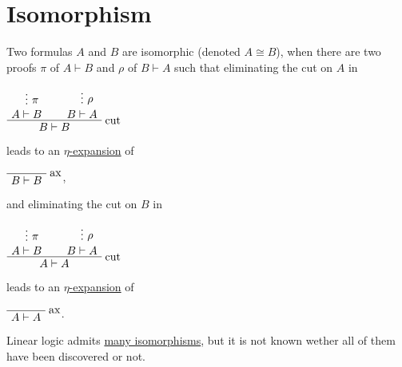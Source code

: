 \section{Isomorphism}\label{isomorphism}

Two formulas \(A\) and \(B\) are isomorphic (denoted \(A\cong B\)), when
there are two proofs \(\pi\) of \(A \vdash B\) and \(\rho\) of
\(B \vdash A\) such that eliminating the cut on \(A\) in

\(\AxRule{}\VdotsRule{\pi}{A \vdash B}\AxRule{}\VdotsRule{\rho}{B \vdash A}\LabelRule{\rulename{cut}}\BinRule{B\vdash B}\DisplayProof\)

leads to an
\href{Sequent_calculus\#Expansion_of_identities}{\(\eta\)-expansion} of

\(\LabelRule{\rulename{ax}}\NulRule{B\vdash B}\DisplayProof\),

and eliminating the cut on \(B\) in

\(\AxRule{}\VdotsRule{\pi}{A \vdash B}\AxRule{}\VdotsRule{\rho}{B \vdash A}\LabelRule{\rulename{cut}}\BinRule{A\vdash A}\DisplayProof\)

leads to an
\href{Sequent_calculus\#Expansion_of_identities}{\(\eta\)-expansion} of

\(\LabelRule{\rulename{ax}}\NulRule{A\vdash A}\DisplayProof\).

Linear logic admits \href{List_of_isomorphisms}{many isomorphisms}, but
it is not known wether all of them have been discovered or not.

